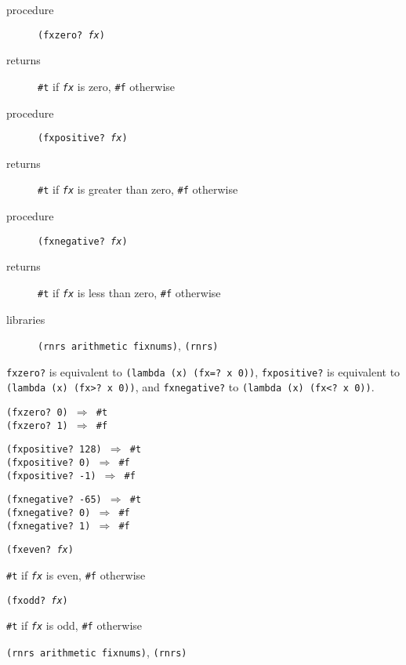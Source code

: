 \begin{description}

\label{objects_s154}\item[procedure] \texttt{(fxzero? \textit{fx})}



\item[returns] \texttt{\#{}t} if \texttt{\textit{fx}} is zero, \texttt{\#{}f} otherwise


\item[procedure] \texttt{(fxpositive? \textit{fx})}



\item[returns] \texttt{\#{}t} if \texttt{\textit{fx}} is greater than zero, \texttt{\#{}f} otherwise


\item[procedure] \texttt{(fxnegative? \textit{fx})}



\item[returns] \texttt{\#{}t} if \texttt{\textit{fx}} is less than zero, \texttt{\#{}f} otherwise


\item[libraries] \texttt{(rnrs arithmetic fixnums)}, \texttt{(rnrs)}
\end{description}

\texttt{fxzero?} is equivalent to \texttt{(lambda (x) (fx=? x 0))},
\texttt{fxpositive?} is equivalent to \texttt{(lambda (x) (fx\textgreater{}? x 0))}, and
\texttt{fxnegative?} to \texttt{(lambda (x) (fx\textless{}? x 0))}.


\begin{alltt}
(fxzero? 0) \(\Rightarrow\) \#{}t
(fxzero? 1) \(\Rightarrow\) \#{}f

(fxpositive? 128) \(\Rightarrow\) \#{}t
(fxpositive? 0) \(\Rightarrow\) \#{}f
(fxpositive? -1) \(\Rightarrow\) \#{}f

(fxnegative? -65) \(\Rightarrow\) \#{}t
(fxnegative? 0) \(\Rightarrow\) \#{}f
(fxnegative? 1) \(\Rightarrow\) \#{}f
\end{alltt}

\begin{description}

\label{objects_s155}\item[procedure] \texttt{(fxeven? \textit{fx})}



\item[returns] \texttt{\#{}t} if \texttt{\textit{fx}} is even, \texttt{\#{}f} otherwise


\item[procedure] \texttt{(fxodd? \textit{fx})}



\item[returns] \texttt{\#{}t} if \texttt{\textit{fx}} is odd, \texttt{\#{}f} otherwise


\item[libraries] \texttt{(rnrs arithmetic fixnums)}, \texttt{(rnrs)}
\end{description}


